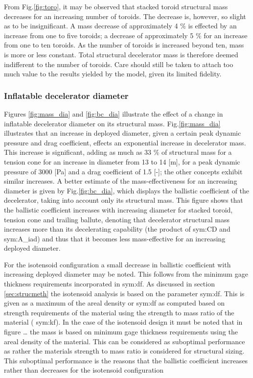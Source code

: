 From Fig.\ref{fig:toro}, it may be observed that stacked toroid structural mass decreases for an increasing number of toroids. The decrease is, however, so slight as to be insignificant. A mass decrease of approximately 4 $\%$ is effected by an increase from one to five toroids; a decrease of approximately 5 $\%$ for an increase from one to ten toroids. As the number of toroids is increased beyond ten, mass is more or less constant. Total structural decelerator mass is therefore deemed indifferent to the number of toroids. Care should still be taken to attach too much value to the results yielded by the model, given its limited fidelity.

\subsubsection{Inflatable decelerator diameter}
Figures \ref{fig:mass_dia} and \ref{fig:bc_dia} illustrate the effect of a change in inflatable decelerator diameter on its structural mass. Fig.\ref{fig:mass_dia} illustrates that an increase in deployed diameter, given a certain peak dynamic pressure and drag coefficient, effects an exponential increase in decelerator mass. This increase is significant, adding as much as 33 $\%$ of structural mass for a tension cone for an increase in diameter from 13 to 14 [m], for a peak dynamic pressure of 3000 [Pa] and a drag coefficient of 1.5 [-]; the other concepts exhibit similar increases. A better estimate of the mass-effectiveness for an increasing diameter is given by Fig.\ref{fig:bc_dia}, which displays the ballistic coefficient of the decelerator, taking into account only its structural mass. This figure shows that the ballistic coefficient increases with increasing diameter for stacked toroid, tension cone and trailing ballute, denoting that decelerator structural mass increases more than its decelerating capability (the product of \gls{sym:CD} and \gls{sym:A_iad}) and thus that it becomes less mass-effective for an increasing deployed diameter.

 For the isotensoid configuration a small decrease in ballistic coefficient with increasing deployed diameter may be noted. This follows from the minimum gage thickness requirements incorporated in \gls{sym:df}. As discussed in section \ref{sec:strucmeth} the isotensoid analysis is based on the parameter \gls{sym:df}. This is given as a maximum of the areal density or \gls{sym:df} as computed based on strength requirements of the material using the strength to mass ratio of the material ( \gls{sym:kf}). In the case of the isotensoid design it must be noted that in figure … the mass is based on minimum gage thickness requirements using the areal density of the material. This can be considered as suboptimal performance as rather the materials strength to mass ratio is considered for structural sizing. This suboptimal performance is the reasons that the ballistic coefficient increases rather than decreases for the isotensoid configuration




